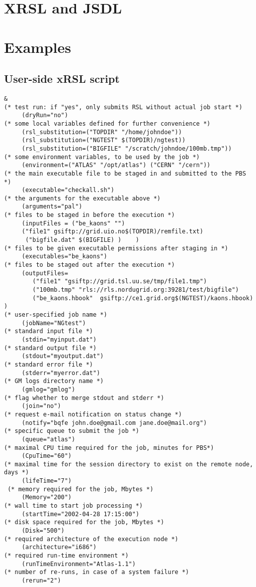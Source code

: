 \documentclass{book}
\begin{document}
  \chapter{XRSL and JSDL}
  \label{sec:jsdl}

  

  \appendix

  \chapter{Examples}
  \label{sec:examples}

  \section{User-side xRSL script}

  \begin{verbatim}
&
(* test run: if "yes", only submits RSL without actual job start *)
     (dryRun="no")
(* some local variables defined for further convenience *)
     (rsl_substitution=("TOPDIR" "/home/johndoe")) 
     (rsl_substitution=("NGTEST" $(TOPDIR)/ngtest))
     (rsl_substitution=("BIGFILE" "/scratch/johndoe/100mb.tmp"))
(* some environment variables, to be used by the job *)
     (environment=("ATLAS" "/opt/atlas") ("CERN" "/cern"))
(* the main executable file to be staged in and submitted to the PBS *)
     (executable="checkall.sh")
(* the arguments for the executable above *)
     (arguments="pal")
(* files to be staged in before the execution *)
     (inputFiles = ("be_kaons" "")
     ("file1" gsiftp://grid.uio.no$(TOPDIR)/remfile.txt) 
      ("bigfile.dat" $(BIGFILE) )    )
(* files to be given executable permissions after staging in *)
     (executables="be_kaons")
(* files to be staged out after the execution *)
     (outputFiles=
        ("file1" "gsiftp://grid.tsl.uu.se/tmp/file1.tmp")
        ("100mb.tmp" "rls://rls.nordugrid.org:39281/test/bigfile")
        ("be_kaons.hbook"  gsiftp://ce1.grid.org$(NGTEST)/kaons.hbook)   )
(* user-specified job name *)
     (jobName="NGtest")
(* standard input file *)
     (stdin="myinput.dat")
(* standard output file *)
     (stdout="myoutput.dat")
(* standard error file *)
     (stderr="myerror.dat")
(* GM logs directory name *)
     (gmlog="gmlog")
(* flag whether to merge stdout and stderr *)
     (join="no")
(* request e-mail notification on status change *)
     (notify="bqfe john.doe@gmail.com jane.doe@mail.org")
(* specific queue to submit the job *)
     (queue="atlas")
(* maximal CPU time required for the job, minutes for PBS*)
     (CpuTime="60")
(* maximal time for the session directory to exist on the remote node, days *)
     (lifeTime="7")
 (* memory required for the job, Mbytes *)
     (Memory="200")
(* wall time to start job processing *)
     (startTime="2002-04-28 17:15:00")
(* disk space required for the job, Mbytes *)
     (Disk="500")
(* required architecture of the execution node *)
     (architecture="i686")
(* required run-time environment *)
     (runTimeEnvironment="Atlas-1.1")
(* number of re-runs, in case of a system failure *)
     (rerun="2")
  \end{verbatim}
\end{document}
